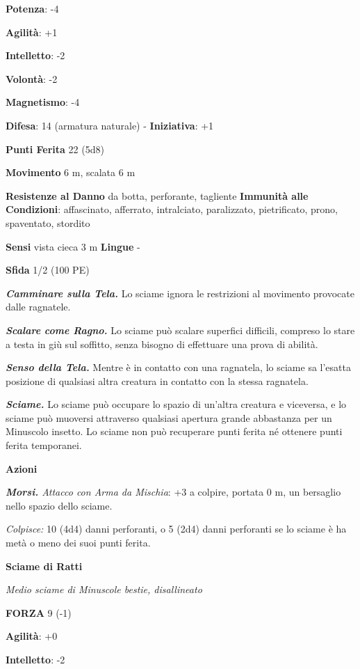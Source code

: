 \begin{multicols}{2}
\textbf{Potenza}: -4

\textbf{Agilità}: +1

\textbf{Intelletto}: -2

\textbf{Volontà}: -2

\textbf{Magnetismo}: -4

\textbf{Difesa}: 14 (armatura naturale) - \textbf{Iniziativa}: +1

\textbf{Punti Ferita} 22 (5d8)

\textbf{Movimento} 6 m, scalata 6 m

\textbf{Resistenze al Danno} da botta, perforante, tagliente
\textbf{Immunità alle Condizioni}: affascinato, afferrato, intralciato,
paralizzato, pietrificato, prono, spaventato, stordito

\textbf{Sensi} vista cieca 3 m \textbf{Lingue} -

\textbf{Sfida} 1/2 (100 PE)\smallskip

\emph{\textbf{Camminare sulla Tela.}} Lo sciame ignora le restrizioni al
movimento provocate dalle ragnatele.

\emph{\textbf{Scalare come Ragno.}} Lo sciame può scalare superfici
difficili, compreso lo stare a testa in giù sul soffitto, senza bisogno
di effettuare una prova di abilità.

\emph{\textbf{Senso della Tela.}} Mentre è in contatto con una
ragnatela, lo sciame sa l'esatta posizione di qualsiasi altra creatura
in contatto con la stessa ragnatela.

\emph{\textbf{Sciame.}} Lo sciame può occupare lo spazio di un'altra
creatura e viceversa, e lo sciame può muoversi attraverso qualsiasi
apertura grande abbastanza per un Minuscolo insetto. Lo sciame non può
recuperare punti ferita né ottenere punti ferita temporanei.

\smallskip\textbf{Azioni}

\emph{\textbf{Morsi.} Attacco con Arma da Mischia}: +3 a colpire,
portata 0 m, un bersaglio nello spazio dello sciame.

\emph{Colpisce:} 10 (4d4) danni perforanti, o 5 (2d4) danni perforanti
se lo sciame è ha metà o meno dei suoi punti ferita.

\textbf{Sciame di Ratti}

\emph{Medio sciame di Minuscole bestie, disallineato}

\textbf{FORZA} 9 (-1)

\textbf{Agilità}: +0

\textbf{Intelletto}: -2


\end{multicols}
